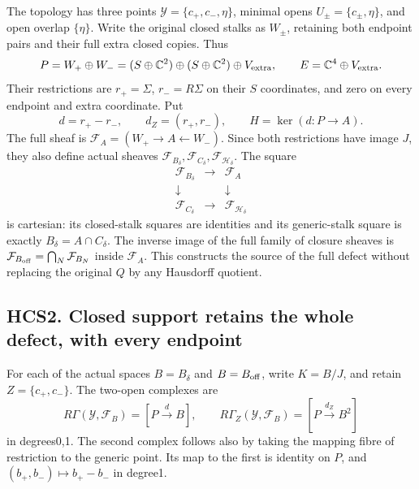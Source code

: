 The topology has three points \(\mathcal Y=\{c_+,c_-,\eta\}\), minimal
opens \(U_\pm=\{c_\pm,\eta\}\), and open overlap \(\{\eta\}\). Write the
original closed stalks as \(W_\pm\), retaining both endpoint pairs and
their full extra closed copies. Thus \[
P=W_+\oplus W_-=(S\oplus\mathbb C^2)\oplus
(S\oplus\mathbb C^2)\oplus V_{\rm extra},\qquad
E=\mathbb C^4\oplus V_{\rm extra}.
\] Their restrictions are \(r_+=\Sigma\), \(r_-=R\Sigma\) on their \(S\)
coordinates, and zero on every endpoint and extra coordinate. Put \[
d=r_+-r_-,\qquad d_Z=(r_+,r_-),\qquad H=\ker(d:P\to A).
\tag{HCS1.8}
\] The full sheaf is \(\mathcal F_A=(W_+\to A\leftarrow W_-)\). Since
both restrictions have image \(J\), they also define actual sheaves
\(\mathcal F_{B_\delta},\mathcal F_{C_\delta},
\mathcal F_{\mathcal H_\delta}\). The square \[
\begin{array}{ccc}
\mathcal F_{B_\delta}&\longrightarrow&\mathcal F_A\\
\downarrow&&\downarrow\\
\mathcal F_{C_\delta}&\longrightarrow&\mathcal F_{\mathcal H_\delta}
\end{array}
\tag{HCS1.9}
\] is cartesian: its closed-stalk squares are identities and its
generic-stalk square is exactly \(B_\delta=A\cap C_\delta\). The inverse
image of the full family of closure sheaves is
\(\mathcal F_{B_{\rm off}}=\bigcap_N\mathcal F_{B_N}\) inside
\(\mathcal F_A\). This constructs the source of the full defect without
replacing the original \(Q\) by any Hausdorff quotient.

\subsection{HCS2. Closed support retains the whole defect, with every
endpoint}\label{hcs2.-closed-support-retains-the-whole-defect-with-every-endpoint}

For each of the actual spaces \(B=B_\delta\) and \(B=B_{\rm off}\),
write \(K=B/J\), and retain \(Z=\{c_+,c_-\}\). The two-open complexes
are \[
R\Gamma(\mathcal Y,\mathcal F_B)=[P\xrightarrow d B],
\qquad
R\Gamma_Z(\mathcal Y,\mathcal F_B)
=[P\xrightarrow{d_Z}B^2]
\tag{HCS2.1}
\] in degrees0,1. The second complex follows also by taking the mapping
fibre of restriction to the generic point. Its map to the first is
identity on \(P\), and \((b_+,b_-)\mapsto b_+-b_-\) in degree1.


